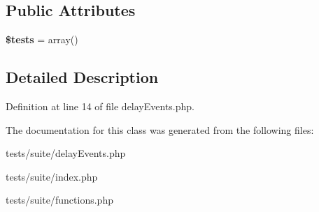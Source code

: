 \subsection*{Public Attributes}
\begin{DoxyCompactItemize}
\item 
\hypertarget{classclsRequests_ae521025ac891c847910ebb47b3fad90f}{
{\bfseries \$tests} = array()}
\label{classclsRequests_ae521025ac891c847910ebb47b3fad90f}

\end{DoxyCompactItemize}


\subsection{Detailed Description}


Definition at line 14 of file delayEvents.php.



The documentation for this class was generated from the following files:\begin{DoxyCompactItemize}
\item 
tests/suite/delayEvents.php\item 
tests/suite/index.php\item 
tests/suite/functions.php\end{DoxyCompactItemize}
